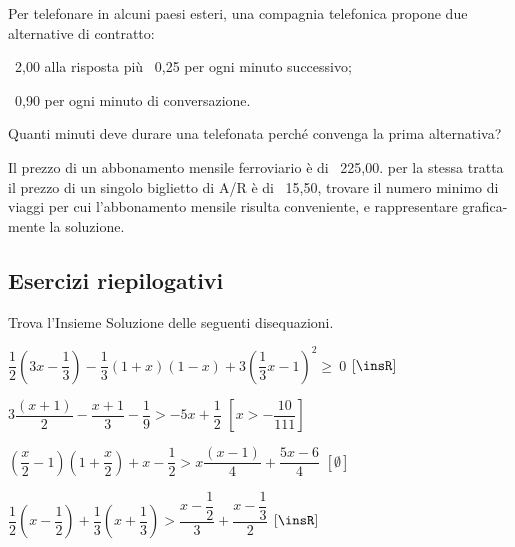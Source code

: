 \begin{multicols}{2}
 \begin{esercizio}[]
 \label{ese:dis_}
 Per telefonare in alcuni paesi esteri, una compagnia telefonica
propone due alternative di contratto:
\begin{enumeratea}
 \item \officialeuro\ 2,00 alla risposta più \officialeuro\ 0,25 per ogni 
minuto successivo;
\item \officialeuro\ 0,90 per ogni minuto di conversazione.
\end{enumeratea}
Quanti minuti deve durare una telefonata perché convenga la prima
alternativa?
 \end{esercizio}

\begin{esercizio}[]
 \label{ese:dis_}
 Il prezzo di un abbonamento mensile ferroviario è di \officialeuro\ 225,00.
 per la stessa tratta il prezzo di un singolo biglietto di A/R è 
di \officialeuro\ 15,50, trovare il numero minimo di viaggi per
cui l'abbonamento mensile risulta conveniente, e
rappresentare grafica-mente la soluzione.
 \end{esercizio}


\end{multicols}

\subsection{Esercizi riepilogativi}

\begin{esercizio}[\Ast]
 \label{ese:21.15}
Trova l'Insieme Soluzione delle seguenti disequazioni.
 \begin{enumeratea}
\item
 $\dfrac{1}{2}\left(3x-\dfrac{1}{3}\right)-\dfrac{1}{3}(1+x)(1-x)+
  3\left(\dfrac{1}{3}x-1\right)^{2}\ge~0$
 \hfill $\left[\insR\right]$
\item
 $3\dfrac{(x+1)}{2}-\dfrac{x+1}{3}-\dfrac{1}{9}>-5x+\dfrac{1}{2}$
 \hfill $\left[x>-{\dfrac{10}{111}}\right]$
\item
 $\left(\dfrac{x}{2}-1\right)\left(1+\dfrac{x}{2}\right)+x-\dfrac{1}{2}>
  x\dfrac{(x-1)}{4}+\dfrac{5x-6}{4}$
 \hfill $\left[\emptyset\right]$
\item
 $\dfrac{1}{2}\left(x-\dfrac{1}{2}\right)+\dfrac{1}{3}\left(x+
  \dfrac{1}{3}\right)>\dfrac{x-\dfrac{1}{2}}{3}+\dfrac{x-\dfrac{1}{3}}{2}$
 \hfill $\left[\insR\right]$
\end{enumeratea}
\end{esercizio}

